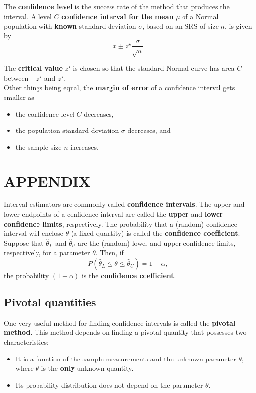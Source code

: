 \vspace{1em}

The \textbf{confidence level} is the success rate of the method that produces the interval.
 A level $C$ \textbf{confidence interval for the mean} $\mu$ of a Normal population with \textbf{known} standard deviation $\sigma$, based on an SRS of size $n$, is given by
\[
\bar{x} \pm z^\star \frac{\sigma}{\sqrt{n}}
\]

The \textbf{critical value} $z^\star$ is chosen so that the standard Normal curve has area $C$ between $-z^\star$ and $z^\star$. \\

Other things being equal, the \textbf{margin of error} of a confidence interval gets smaller as
\begin{itemize}
    \item the confidence level $C$ decreases,
    \item the population standard deviation $\sigma$ decreases, and
    \item the sample size $n$ increases.
\end{itemize}
\vspace{\baselineskip} 
\section{APPENDIX}


Interval estimators are commonly called \textbf{confidence intervals}. The upper and lower endpoints of a confidence interval are called the \textbf{upper} and \textbf{lower confidence limits}, respectively. The probability that a (random) confidence interval will enclose $\theta$ (a fixed quantity) is called the \textbf{confidence coefficient}.\\


Suppose that $\hat{\theta}_L$ and $\hat{\theta}_U$ are the (random) lower and upper confidence limits, respectively, for a parameter $\theta$. Then, if
$$P(\hat{\theta}_L \leq \theta \leq \hat{\theta}_U) = 1 - \alpha,$$
the probability $(1 - \alpha)$ is the \textbf{confidence coefficient}.

\subsection*{Pivotal quantities}
One very useful method for finding confidence intervals is called the \textbf{pivotal method}. This method depends on finding a pivotal quantity that possesses two characteristics:
\begin{itemize}
    \item It is a function of the sample measurements and the unknown parameter $\theta$, where $\theta$ is the \textbf{only} unknown quantity.
    \item Its probability distribution does not depend on the parameter $\theta$.
\end{itemize}


